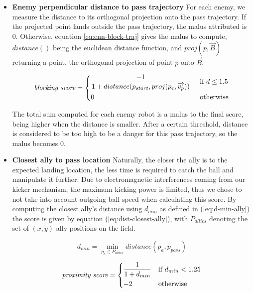 \begin{itemize}
    \item \textbf{Enemy perpendicular distance to pass trajectory}
    For each enemy, we measure the distance to its orthogonal projection onto the pass trajectory.
    If the projected point lands outside the pass trajectory, the malus attributed is 0.
    Otherwise, equation \ref{eq:enn-block-traj} gives the malus to compute,
    $distance()$ being the euclidean distance function, and $proj(p, \vec{B})$ returning a point,
    the orthogonal projection of point $p$ onto $\vec{B}$.
    
    \begin{equation}
        \label{eq:enn-block-traj}
        \textit{blocking score} =
        \begin{dcases}
            \frac{-1}{1 + distance(p_{start}, proj(p_e, \overrightarrow{v_p}))} & \text{ if } d \leq 1.5 \\
            0 & \text{ otherwise}
        \end{dcases}
    \end{equation}

    The total sum computed for each enemy robot is a malus to the final score, being higher when the distance is smaller.
    After a certain threshold, distance is considered to be too high to be a danger for this pass 
    trajectory, so the malus becomes 0. \\

    \item \textbf{Closest ally to pass location}
    Naturally, the closer the ally is to the expected landing location, the less time is required
    to catch the ball and manipulate it further. Due to electromagnetic interferences coming
    from our kicker mechanism, the maximum kicking power is limited, thus we chose to not take into account outgoing ball speed
    when calculating this score. By computing the closest ally's distance using $d_{min}$ as defined in (\ref{eq:d-min-ally})
    the score is given by equation (\ref{eq:dist-closest-ally}), with $P_{allies}$ denoting the set of $(x, y)$ ally positions on the field.
    
    \begin{equation}
        \label{eq:d-min-ally}
        d_{min} = \min_{p_a \in P_{allies}} distance(p_a, p_{pass})
    \end{equation}

    \begin{equation}
        \label{eq:dist-closest-ally}
        \textit{proximity score} =
        \begin{dcases}
            \frac{1}{1 + d_{min}} & \text{if } d_{min} < 1.25\\
            -2 & \text{otherwise}
        \end{dcases}
    \end{equation}


\end{itemize}
